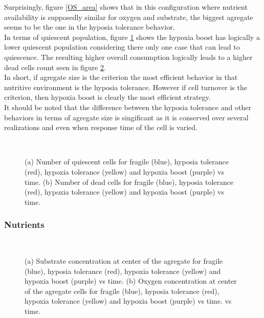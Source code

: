 \documentclass[11pt,a4paper]{article}
\begin{document}
Surprisingly, figure \ref{OS_area} shows that in this configuration where nutrient availability is supposedly similar for oxygen and substrate, the biggest agregate seems to be the one in the hyposia tolerance behavior.\\

In terms of quiescent population, figure \ref{OS_quiesc} shows the hypoxia boost has logically a lower quiescent population considering there only one case that can lead to quiescence. The resulting higher overall consumption logically leads to a higher dead cells count seen in figure \ref{OS_dead}.\\

In short, if agregate size is the criterion the most efficient behavior in that nutritive environment is the hyposia tolerance. However if cell turnover is the criterion, then hypoxia boost is clearly the most efficient strategy.\\

It should be noted that the difference between the hyposia tolerance and other behaviors in terms of agregate size is singificant as it is conserved over several realizations and even when response time of the cell is varied.\\

\begin{figure}[h]
\begin{subfigure}{0.5\textwidth}
	\centering
	
	\caption{ \label{OS_quiesc}}
\end{subfigure}
~~
\begin{subfigure}{0.5\textwidth}
	\centering
	
	\caption{\label{OS_dead}}
\end{subfigure}
\caption{(a) Number of quiescent cells for fragile (blue), hyposia tolerance (red), hypoxia tolerance (yellow) and hypoxia boost (purple) vs time. (b) Number of dead cells for fragile (blue), hyposia tolerance (red), hypoxia tolerance (yellow) and hypoxia boost (purple) vs time. \label{OS_quiesc_dead}}
\end{figure}


\subsubsection{Nutrients}
\begin{figure}[h]
\begin{subfigure}{0.5\textwidth}
	\centering
	
	\caption{ \label{OS_S_ctr}}
\end{subfigure}
~~
\begin{subfigure}{0.5\textwidth}
	\centering
	
	\caption{\label{OS_O_ctr}}
\end{subfigure}
\caption{(a) Substrate concentration at center of the agregate for fragile (blue), hyposia tolerance (red), hypoxia tolerance (yellow) and hypoxia boost (purple) vs time. (b) Oxygen concentration at center of the agregate cells for fragile (blue), hyposia tolerance (red), hypoxia tolerance (yellow) and hypoxia boost (purple) vs time. vs time. \label{OS_SO_ctr}}
\end{figure}
\end{document}
